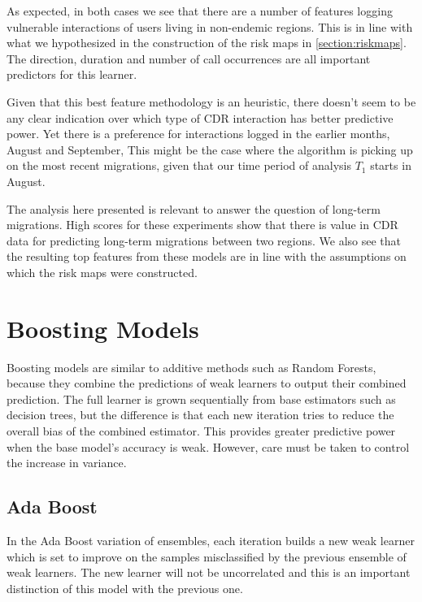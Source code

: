 As expected, in both cases we see that there are a number of features logging vulnerable interactions of users living in non-endemic regions.
This is in line with what we hypothesized in the construction of the risk maps in \cref{section:riskmaps}.
The direction, duration and number of call occurrences are all important predictors for this learner.

Given that this best feature methodology is an heuristic, there doesn't seem to be any clear indication over which type of CDR interaction has better predictive power.
Yet there is a preference for interactions logged in the earlier months, August and September,
This might be the case where the algorithm is picking up on the most recent migrations, given that our time period of analysis $T_1$ starts in August.

The analysis here presented is relevant to answer the question of long-term migrations.
High scores for these experiments show that there is value in CDR data for predicting long-term migrations between two regions.
We also see that the resulting top features from these models are in line with the assumptions on which the risk maps were constructed.


\section{Boosting Models}\label{section:gradient_boosting}

Boosting models are similar to additive methods such as Random Forests, because they combine the predictions of weak learners to output their combined prediction.
The full learner is grown sequentially from base estimators such as decision trees, but the difference is that each new iteration tries to reduce the overall bias of the combined estimator.
This provides greater predictive power when the base model's accuracy is weak.
However, care must be taken to control the increase in variance.

\subsection{Ada Boost}

In the Ada Boost variation of ensembles, each iteration builds a new weak learner which is set to improve on the samples misclassified by the previous ensemble of weak learners.
The new learner will not be uncorrelated and this is an important distinction of this model with the previous one.

